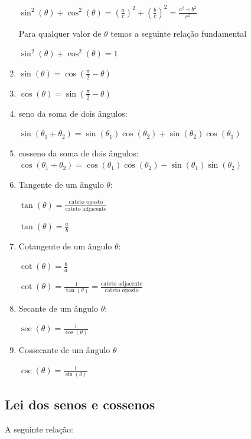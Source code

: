\begin{multicols*}{2}
\begin{enumerate}[wide, labelwidth=!, labelindent=0pt]
              $\sin^2(\theta) + \cos^2(\theta) =  \left( \frac{a}{c} \right)^2 + \left(  \frac{b}{c} \right)^2 =
                  \frac{a^2 + b^2}{c^2}$

              Para qualquer valor de $\theta$ temos a seguinte relação fundamental

              $\sin^2 (\theta) + \cos^2(\theta) = 1$

        \item $\sin(\theta)  = \cos \left( \frac{\pi}{2} - \theta\right)$
        \item $\cos(\theta)  = \sin \left( \frac{\pi}{2} - \theta\right)$
        \item seno da soma de dois ângulos:

              $\sin(\theta_1 + \theta_2) = \sin(\theta_1) \cos(\theta_2) + \sin( \theta_2) \cos(\theta_1)$

        \item cosseno da soma de dois ângulos:
              $\cos(\theta_1 + \theta_2) = \cos(\theta_1) \cos(\theta_2) - \sin(\theta_1) \sin(\theta_2)$

        \item Tangente de um ângulo $\theta$:

              $\tan(\theta) = \frac{\mbox{cateto oposto} }{\mbox{cateto adjacente}}$

              $\tan(\theta) = \frac{a}{b}$

        \item Cotangente de um ângulo $\theta$:

              $\cot(\theta) = \frac{b}{a}$

              $\cot(\theta) = \frac{1}{\tan(\theta)} = \frac{\mbox{cateto adjacente}}{\mbox{cateto oposto}}$

        \item Secante de um ângulo $\theta$:

              $\sec(\theta) = \frac{1}{\cos(\theta)} $

        \item Cossecante de um ângulo $\theta$

              $\csc(\theta) = \frac{1}{\sin(\theta)}$
    \end{enumerate}

    \subsection*{Lei dos senos e cossenos}

    A seguinte relação:




\end{multicols*}
